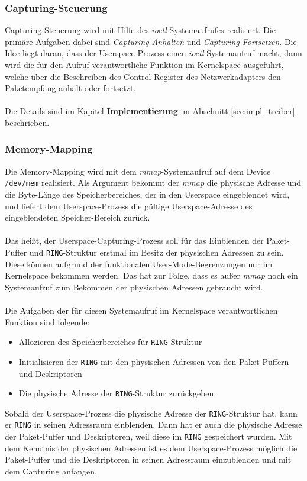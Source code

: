 \subsubsection*{Capturing-Steuerung}
Capturing-Steuerung wird mit Hilfe des \emph{ioctl}-Systemaufrufes realisiert.
Die primäre Aufgaben dabei sind \emph{Capturing-Anhalten} und
\emph{Capturing-Fortsetzen}.  Die Idee liegt daran, dass der Userspace-Prozess
einen \emph{ioctl}-Systemaufruf macht, dann wird die für den Aufruf
verantwortliche Funktion im Kernelspace ausgeführt, welche über die Beschreiben
des Control-Register des Netzwerkadapters den Paketempfang anhält oder
fortsetzt.\\\\ 
%
Die Details sind im Kapitel \textbf{Implementierung} im Abschnitt
\ref{sec:impl_treiber} beschrieben.
 
\subsubsection*{Memory-Mapping}\label{sec:memmap}
Die Memory-Mapping wird mit dem \emph{mmap}-Systemaufruf auf dem Device
\verb+/dev/mem+ realisiert. Als Argument bekommt der \emph{mmap} die physische
Adresse und die Byte-Länge des Speicherbereiches, der in den Userspace
eingeblendet wird, und liefert dem Userspace-Prozess die gültige
Userspace-Adresse des eingeblendeten Speicher-Bereich zurück.\\\\
%
Das heißt, der Userspace-Capturing-Prozess soll für das Einblenden der
Paket-Puffer und \verb+RING+-Struktur  erstmal im Besitz der physischen
Adressen zu sein. Diese können aufgrund der funktionalen User-Mode-Begrenzungen
nur im Kernelspace bekommen werden. Das hat zur Folge, dass es außer
\emph{mmap} noch ein Systemaufruf zum Bekommen der physischen Adressen
gebraucht wird. \\\\
%
Die Aufgaben der für diesen Systemaufruf im Kernelspace verantwortlichen
Funktion sind folgende: 
\begin{itemize}
	\item Allozieren des Speicherbereiches für \verb+RING+-Struktur
	\item Initialisieren der \verb+RING+ mit den physischen Adressen 
		von den Paket-Puffern und Deskriptoren
	\item Die physische Adresse der \verb+RING+-Struktur zurückgeben
\end{itemize}
Sobald der Userspace-Prozess die physische Adresse der \verb+RING+-Struktur
hat, kann er \verb+RING+ in seinen Adressraum einblenden. Dann hat er auch die
physische Adresse der Paket-Puffer und Deskriptoren, weil diese im \verb+RING+
gespeichert wurden. Mit dem Kenntnis der physischen Adressen ist es dem 
Userspace-Prozess möglich die Paket-Puffer und die Deskriptoren in seinen 
Adressraum einzublenden und mit dem Capturing anfangen.

